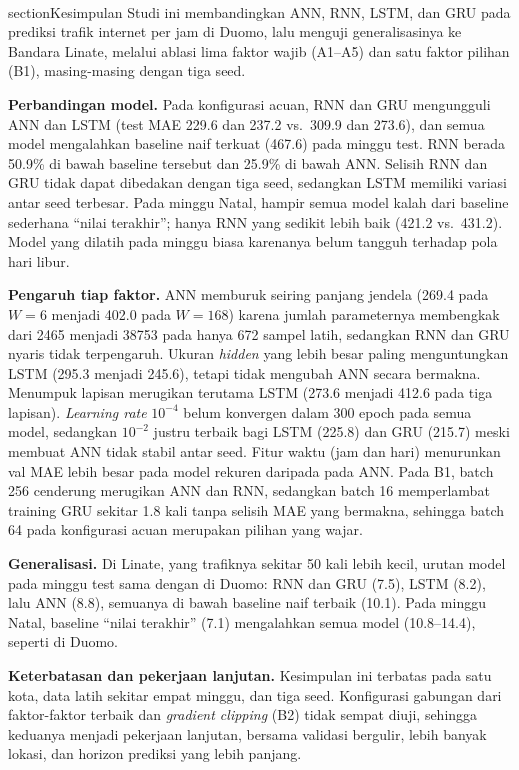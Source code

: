 \documentclass[conference,a4paper]{IEEEtran}
\begin{document}
\\section{Kesimpulan}
Studi ini membandingkan ANN, RNN, LSTM, dan GRU pada prediksi trafik internet per jam di Duomo, lalu menguji generalisasinya ke Bandara Linate, melalui ablasi lima faktor wajib (A1--A5) dan satu faktor pilihan (B1), masing-masing dengan tiga seed.

\textbf{Perbandingan model.} Pada konfigurasi acuan, RNN dan GRU mengungguli ANN dan LSTM (test MAE 229.6 dan 237.2 vs.\ 309.9 dan 273.6), dan semua model mengalahkan baseline naif terkuat (467.6) pada minggu test. RNN berada 50.9\% di bawah baseline tersebut dan 25.9\% di bawah ANN. Selisih RNN dan GRU tidak dapat dibedakan dengan tiga seed, sedangkan LSTM memiliki variasi antar seed terbesar. Pada minggu Natal, hampir semua model kalah dari baseline sederhana ``nilai terakhir''; hanya RNN yang sedikit lebih baik (421.2 vs.\ 431.2). Model yang dilatih pada minggu biasa karenanya belum tangguh terhadap pola hari libur.

\textbf{Pengaruh tiap faktor.} ANN memburuk seiring panjang jendela (269.4 pada $W{=}6$ menjadi 402.0 pada $W{=}168$) karena jumlah parameternya membengkak dari 2465 menjadi 38753 pada hanya 672 sampel latih, sedangkan RNN dan GRU nyaris tidak terpengaruh. Ukuran \textit{hidden} yang lebih besar paling menguntungkan LSTM (295.3 menjadi 245.6), tetapi tidak mengubah ANN secara bermakna. Menumpuk lapisan merugikan terutama LSTM (273.6 menjadi 412.6 pada tiga lapisan). \textit{Learning rate} $10^{-4}$ belum konvergen dalam 300 epoch pada semua model, sedangkan $10^{-2}$ justru terbaik bagi LSTM (225.8) dan GRU (215.7) meski membuat ANN tidak stabil antar seed. Fitur waktu (jam dan hari) menurunkan val MAE lebih besar pada model rekuren daripada pada ANN. Pada B1, batch 256 cenderung merugikan ANN dan RNN, sedangkan batch 16 memperlambat training GRU sekitar 1.8 kali tanpa selisih MAE yang bermakna, sehingga batch 64 pada konfigurasi acuan merupakan pilihan yang wajar.

\textbf{Generalisasi.} Di Linate, yang trafiknya sekitar 50 kali lebih kecil, urutan model pada minggu test sama dengan di Duomo: RNN dan GRU (7.5), LSTM (8.2), lalu ANN (8.8), semuanya di bawah baseline naif terbaik (10.1). Pada minggu Natal, baseline ``nilai terakhir'' (7.1) mengalahkan semua model (10.8--14.4), seperti di Duomo.

\textbf{Keterbatasan dan pekerjaan lanjutan.} Kesimpulan ini terbatas pada satu kota, data latih sekitar empat minggu, dan tiga seed. Konfigurasi gabungan dari faktor-faktor terbaik dan \textit{gradient clipping} (B2) tidak sempat diuji, sehingga keduanya menjadi pekerjaan lanjutan, bersama validasi bergulir, lebih banyak lokasi, dan horizon prediksi yang lebih panjang.
 
\end{document}
